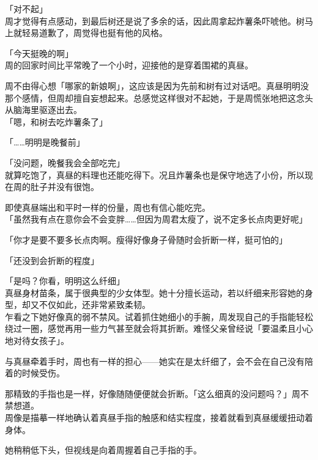 「对不起」\\

周才觉得有点感动，到最后树还是说了多余的话，因此周拿起炸薯条吓唬他。树马上就轻易道歉了，周觉得也挺有他的风格。\\

\vspace{2\baselineskip}

「今天挺晚的啊」\\

周的回家时间比平常晚了一个小时，迎接他的是穿着围裙的真昼。

周不由得心想「哪家的新娘啊」，这应该是因为先前和树有过对话吧。真昼明明没那个感情，但周却擅自妄想起来。总感觉这样很对不起她，于是周慌张地把这念头从脑海里驱逐出去。\\

「嗯，和树去吃炸薯条了」

「……明明是晚餐前」

「没问题，晚餐我会全部吃完」\\

就算吃饱了，真昼的料理也还能吃得下。况且炸薯条也是保守地选了小份，所以现在周的肚子并没有很饱。

即使真昼端出和平时一样的份量，周也有信心能吃完。\\

「虽然我有点在意你会不会变胖……但因为周君太瘦了，说不定多长点肉更好呢」

「你才是要不要多长点肉啊。瘦得好像身子骨随时会折断一样，挺可怕的」

「还没到会折断的程度」

「是吗？你看，明明这么纤细」\\

真昼身材苗条，属于很典型的少女体型。她十分擅长运动，若以纤细来形容她的身型，却又不仅如此，还非常紧致柔韧。\\

乍看之下她好像真的弱不禁风。试着抓住她细小的手腕，周发现自己的手指能轻松绕过一圈，感觉再用一些力气甚至就会将其折断。难怪父亲曾经说「要温柔且小心地对待女孩子」。

与真昼牵着手时，周也有一样的担心——她实在是太纤细了，会不会在自己没有陪着的时候受伤。

那精致的手指也是一样，好像随随便便就会折断。「这么细真的没问题吗？」周不禁想道。\\

周像是描摹一样地确认着真昼手指的触感和结实程度，接着就看到真昼缓缓扭动着身体。

她稍稍低下头，但视线是向着周握着自己手指的手。\\

